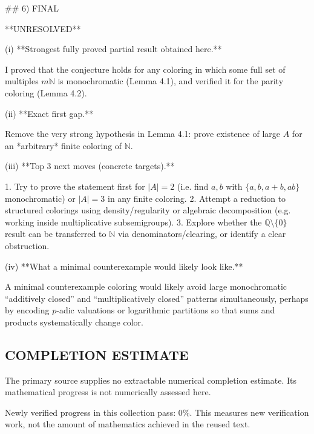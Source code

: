 ## 6) FINAL

**UNRESOLVED**

(i) **Strongest fully proved partial result obtained here.**

I proved that the conjecture holds for any coloring in which some full set of multiples $m\mathbb N$ is monochromatic (Lemma 4.1), and verified it for the parity coloring (Lemma 4.2).

(ii) **Exact first gap.**

Remove the very strong hypothesis in Lemma 4.1: prove existence of large $A$ for an *arbitrary* finite coloring of $\mathbb N$.

(iii) **Top 3 next moves (concrete targets).**

1. Try to prove the statement first for $|A|=2$ (i.e. find $a,b$ with $\{a,b,a+b,ab\}$ monochromatic) or $|A|=3$ in any finite coloring.
2. Attempt a reduction to structured colorings using density/regularity or algebraic decomposition (e.g. working inside multiplicative subsemigroups).
3. Explore whether the $\mathbb Q\setminus\{0\}$ result can be transferred to $\mathbb N$ via denominators/clearing, or identify a clear obstruction.

(iv) **What a minimal counterexample would likely look like.**

A minimal counterexample coloring would likely avoid large monochromatic “additively closed” and “multiplicatively closed” patterns simultaneously, perhaps by encoding $p$-adic valuations or logarithmic partitions so that sums and products systematically change color.




\subsection*{COMPLETION ESTIMATE}
The primary source supplies no extractable numerical completion estimate. Its mathematical progress is not numerically assessed here.

Newly verified progress in this collection pass: $0\%$. This measures new verification work, not the amount of mathematics achieved in the reused text.
